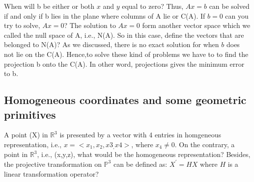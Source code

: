 \documentclass[12pt]{article}%
\begin{document}
\begin{figure}%
    \centering
    \qquad
    \label{fig:example}%
\end{figure}

When will b be either or both $x$ and $y$ equal to zero? Thus, $Ax = b$ can be solved if and only if b lies in the plane where columns of A lie or C(A). If $b=0$ can you try to solve, $Ax=0$? The solution to $Ax=0$ form another vector space which we called the null space of A, i.e., N(A). So in this case, define the vectors that are belonged to N(A)? %
As we discussed, there is no exact solution for when $b$ does not lie on the C(A). Hence,to solve these kind of problems we have to to find the projection b onto the C(A). In other word, projections gives the minimum error to b. 


\subsection{Homogeneous coordinates and some geometric primitives}
A point (X) in $\mathbb{R}^3$  is presented by a vector with 4 entries in homgeneous representation, i.e.,  $x=<x_1, x_2, x3_, x4>$, where $x_4 \neq 0$. On the contrary, a point in $\mathbb{R}^3$, i.e., (x,y,z), what would be the homogeneous representation? Besides, the projective transformation on $\mathbb{P}^3$ can be defined as: $X^{'} = HX$ where $H$ is a linear transformation operator? 
\end{document}
